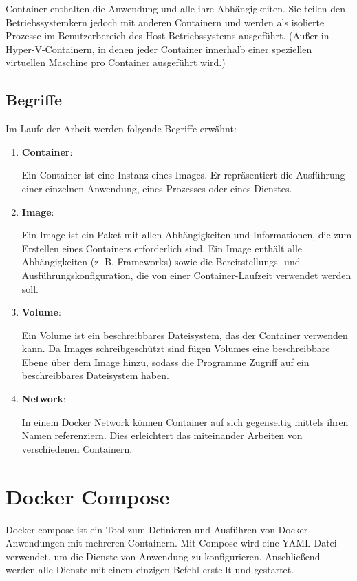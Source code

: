 Container enthalten die Anwendung und alle ihre Abhängigkeiten. Sie teilen den Betriebssystemkern jedoch mit anderen Containern und werden als isolierte Prozesse im Benutzerbereich des Host-Betriebssystems ausgeführt. (Außer in Hyper-V-Containern, in denen jeder Container innerhalb einer speziellen virtuellen Maschine pro Container ausgeführt wird.) \cite{docker}

\subsection{Begriffe}\label{docker-terminology}

Im Laufe der Arbeit werden folgende Begriffe erwähnt:

\begin{enumerate}
    \item \textbf{Container}:
    
    Ein Container ist eine Instanz eines Images. Er repräsentiert die Ausführung einer einzelnen Anwendung, eines Prozesses oder eines Dienstes. 

    \item \textbf{Image}:
    
    Ein Image ist ein Paket mit allen Abhängigkeiten und Informationen, die zum Erstellen eines Containers erforderlich sind. Ein Image enthält alle Abhängigkeiten (z. B. Frameworks) sowie die Bereitstellungs- und Ausführungskonfiguration, die von einer Container-Laufzeit verwendet werden soll. 

    \item \textbf{Volume}:
    
    Ein Volume ist ein beschreibbares Dateisystem, das der Container verwenden kann. Da Images schreibgeschützt sind fügen Volumes eine beschreibbare Ebene über dem Image hinzu, sodass die Programme Zugriff auf ein beschreibbares Dateisystem haben. 

    \item \textbf{Network}:

    In einem Docker Network können Container auf sich gegenseitig mittels ihren Namen referenziern. Dies erleichtert das miteinander Arbeiten von verschiedenen Containern.
\end{enumerate}

\section{Docker Compose}\label{sec:docker-compose}

Docker-compose ist ein Tool zum Definieren und Ausführen von Docker-Anwendungen mit mehreren Containern. Mit Compose wird eine YAML-Datei verwendet, um die Dienste von Anwendung zu konfigurieren. Anschließend werden alle Dienste mit einem einzigen Befehl erstellt und gestartet. \cite{docker_compose_description}

